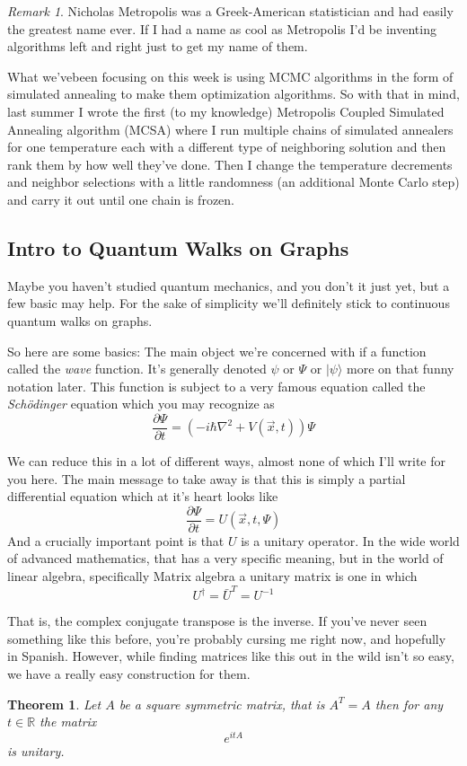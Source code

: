 \documentclass{article}
\newtheorem{thm}{Theorem}
\theoremstyle{definition}
\theoremstyle{remark}
\newtheorem*{rem}{Remark}
\newcommand{\R}{\mathbb{R}}
\newcommand{\ket}[1]{|#1\rangle}
\begin{document}
\begin{rem}
	Nicholas Metropolis was a Greek-American statistician and had easily the greatest name ever.  If I had a name as cool as Metropolis I'd be inventing algorithms left and right just to get my name of them. 
\end{rem}



What we'vebeen focusing on this week is using MCMC algorithms in the form of simulated annealing to make them optimization algorithms.  So with that in mind, last summer I wrote the first (to my knowledge) Metropolis Coupled Simulated Annealing algorithm (MCSA) where I run multiple chains of simulated annealers for one temperature each with a different type of neighboring solution and then rank them by how well they've done.  Then I change the temperature decrements and neighbor selections with a little randomness (an additional Monte Carlo step) and carry it out until one chain is frozen.


\subsection{Intro to Quantum Walks on Graphs}

Maybe you haven't studied quantum mechanics, and you don't it just yet, but a few basic may help.  For the sake of simplicity we'll definitely stick to continuous quantum walks on graphs.

So here are some basics:
The main object we're concerned with if a function called the \emph{wave} function.  It's generally denoted $\psi$ or $\Psi$ or $\ket{\psi}$ more on that funny notation later. This function is subject to a very famous equation called the \emph{Sch\"{o}dinger} equation which you may recognize as 
\[
\frac{\partial \Psi}{\partial t} = \left(-i\hbar\nabla^2 + V(\vec{x},t)\right) \Psi
\]

We can reduce this in a lot of different ways, almost none of which I'll write for you here.  The main message to take away is that this is simply a partial differential equation which at it's heart looks like
\[
\frac{\partial \Psi}{\partial t} = U(\vec{x},t,\Psi)
\]
And a crucially important point is that $U$ is a unitary operator.  In the wide world of advanced mathematics, that has a very specific meaning, but in the world of linear algebra, specifically Matrix algebra a unitary matrix is one in which 
\[
U^{\dag} = \bar{U}^T = U^{-1}
\]

That is, the complex conjugate transpose is the inverse.  If you've never seen something like this before, you're probably cursing me right now, and hopefully in Spanish.  However, while finding matrices like this out in the wild isn't so easy, we have a really easy construction for them.  
\begin{thm}
	Let $A$ be a square symmetric matrix, that is $A^T = A$ then for any $t\in\R$ the matrix
	\[
	e^{itA} 
	\]
	is unitary.
\end{thm}
\end{document}
